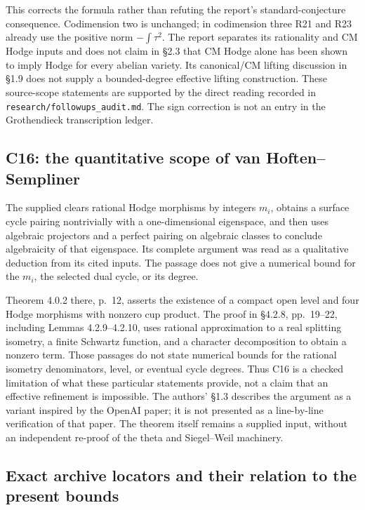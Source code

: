 This corrects the formula rather than refuting the report's standard-conjecture consequence. Codimension two is unchanged; in codimension three R21 and R23 already use the positive norm $-\int\tau^2$. The report separates its rationality and CM Hodge inputs and does not claim in \S2.3 that CM Hodge alone has been shown to imply Hodge for every abelian variety. Its canonical/CM lifting discussion in \S1.9 does not supply a bounded-degree effective lifting construction. These source-scope statements are supported by the direct reading recorded in \texttt{research/followups\_audit.md}. The sign correction is not an entry in the Grothendieck transcription ledger.

\subsection{C16: the quantitative scope of van Hoften--Sempliner}

The supplied \cite[Theorem 2.3.4 and proof, pp.~7--8]{VanHoftenSempliner} clears rational Hodge morphisms by integers $m_i$, obtains a surface cycle pairing nontrivially with a one-dimensional eigenspace, and then uses algebraic projectors and a perfect pairing on algebraic classes to conclude algebraicity of that eigenspace. Its complete argument was read as a qualitative deduction from its cited inputs. The passage does not give a numerical bound for the $m_i$, the selected dual cycle, or its degree.

Theorem 4.0.2 there, p.~12, asserts the existence of a compact open level and four Hodge morphisms with nonzero cup product. The proof in \S4.2.8, pp.~19--22, including Lemmas 4.2.9--4.2.10, uses rational approximation to a real splitting isometry, a finite Schwartz function, and a character decomposition to obtain a nonzero term. Those passages do not state numerical bounds for the rational isometry denominators, level, or eventual cycle degrees. Thus C16 is a checked limitation of what these particular statements provide, not a claim that an effective refinement is impossible. The authors' \S1.3 describes the argument as a variant inspired by the OpenAI paper; it is not presented as a line-by-line verification of that paper. The theorem itself remains a supplied input, without an independent re-proof of the theta and Siegel--Weil machinery.

\subsection{Exact archive locators and their relation to the present bounds}

